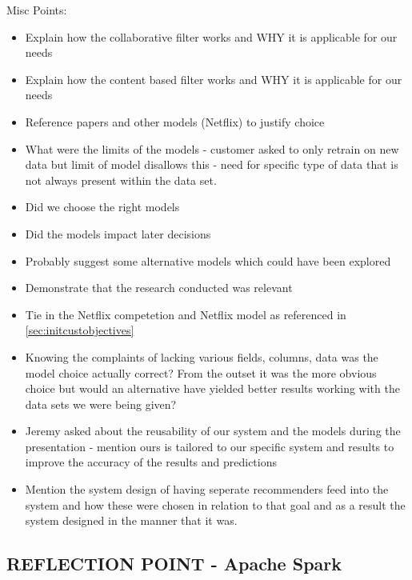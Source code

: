 \documentclass{l3proj}
\begin{document}
Misc Points:
\begin{itemize}
\item Explain how the collaborative filter works and WHY it is applicable for our needs
\item Explain how the content based filter works and WHY it is applicable for our needs
\item Reference papers and other models (Netflix) to justify choice
\item What were the limits of the models - customer asked to only retrain on new data but limit of model disallows this - need for specific type of data that is not always present within the data set.
\item Did we choose the right models
\item Did the models impact later decisions
\item Probably suggest some alternative models which could have been explored
\item Demonstrate that the research conducted was relevant
\item Tie in the Netflix competetion and Netflix model as referenced in \ref{sec:initcustobjectives}
\item Knowing the complaints of lacking various fields, columns, data was the model choice actually correct? From the outset it was the more obvious choice but would an alternative have yielded better results working with the data sets we were being given?
\item Jeremy asked about the reusability of our system and the models during the presentation - mention ours is tailored to our specific system and results to improve the accuracy of the results and predictions
\item Mention the system design of having seperate recommenders feed into the system and how these were chosen in relation to that goal and as a result the system designed in the manner that it was.
\end{itemize}


\subsection{REFLECTION POINT - Apache Spark}
\label{sec:sparkreflection}
\end{document}
